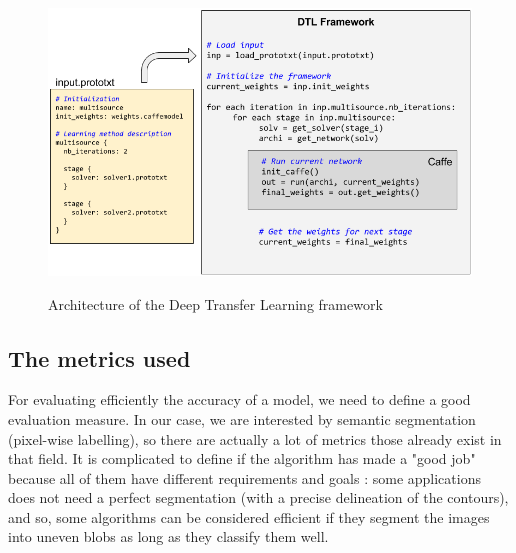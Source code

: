 \begin{figure}[ht!]
  \includegraphics[width=\linewidth,center]{images/part3/dtl_framework_architecture.png}
  \caption{Architecture of the Deep Transfer Learning framework}\textbf{
  \label{fig:part3:dtl_framework_architecture}}
\end{figure}


\subsection{The metrics used} \label{3:tools:metrics}
For evaluating efficiently the accuracy of a model, we need to define a good evaluation measure. In our case, we are interested by semantic segmentation (pixel-wise labelling), so there are actually a lot of metrics those already exist in that field. It is complicated to define if the algorithm has made a "good job" because all of them have different requirements and goals : some applications does not need a perfect segmentation (with a precise delineation of the contours), and so, some algorithms can be considered efficient if they segment the images into uneven blobs as long as they classify them well.

